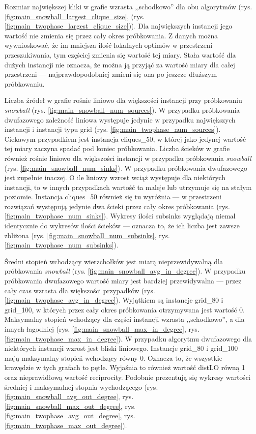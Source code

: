 Rozmiar największej kliki w grafie wzrasta ,,schodkowo'' dla obu algorytmów (rys. \ref{fig:main_snowball_largest_clique_size}, (rys. \ref{fig:main_twophase_largest_clique_size})).
Dla największych instancji jego wartość nie zmienia się przez cały okres próbkowania.
Z danych można wywnioskować, że im mniejsza ilość lokalnych optimów w przestrzeni przeszukiwania, tym częściej zmienia się wartość tej miary.
Stała wartość dla dużych instancji nie oznacza, że można ją przyjąć za wartość miary dla całej przestrzeni --- najprawdopodobniej zmieni się
ona po jeszcze dłuższym próbkowaniu.

Liczba źródeł w grafie rośnie liniowo dla większości instancji przy próbkowaniu \textit{snowball} (rys. \ref{fig:main_snowball_num_sources}).
W przypadku próbkowania dwufazowego zależność liniowa występuje jedynie w przypadku największych instancji i instancji typu grid (rys. \ref{fig:main_twophase_num_sources}).
Ciekawym przypadkiem jest instancja cliques\_50, w której jako jedynej wartość tej miary zaczyna spadać pod koniec próbkowania.
Liczba ścieków w grafie również rośnie liniowo dla większości instancji w przypadku próbkowania \textit{snowball} (rys. \ref{fig:main_snowball_num_sinks}).
W przypadku próbkowania dwufazowego jest zupełnie inaczej. O ile liniowy wzrost wciąż występuje dla niektórych instancji, to w innych przypadkach
wartość ta maleje lub utrzymuje się na stałym poziomie. Instancja cliques\_50 również się tu wyróżnia --- w przestrzeni rozwiązań występują jedynie dwa ścieki
przez cały okres próbkowania (rys. \ref{fig:main_twophase_num_sinks}).
Wykresy ilości subsinks wyglądają niemal identycznie do wykresów ilości ścieków --- oznacza to, że ich liczba jest zawsze zbliżona
(rys. \ref{fig:main_snowball_num_subsinks}, rys. \ref{fig:main_twophase_num_subsinks}).

Średni stopień wchodzący wierzchołków jest miarą nieprzewidywalną dla próbkowania \textit{snowball} (rys. \ref{fig:main_snowball_avg_in_degree}).
W przypadku próbkowania dwufazowego wartość miary jest bardziej przewidywalna --- przez cały czas wzrasta dla większości przypadków (rys. \ref{fig:main_twophase_avg_in_degree}).
Wyjątkiem są instancje grid\_80 i grid\_100, w których przez cały okres próbkowania otrzymywana jest wartość 0.
Maksymalny stopień wchodzący dla części instancji wzrasta ,,schodkowo'', a dla innych łagodniej (rys. \ref{fig:main_snowball_max_in_degree}, rys. \ref{fig:main_twophase_max_in_degree}).
W przypadku algorytmu dwufazowego dla niektórych instancji wzrost jest bliski liniowego.
Instancje grid\_80 i grid\_100 mają maksymalny stopień wchodzący równy 0.
Oznacza to, że wszystkie krawędzie w tych grafach to pętle. Wyjaśnia to również wartość distLO równą 1 oraz nieprawidłową wartość reciprocity.
Podobnie prezentują się wykresy wartości średniej i maksymalnej stopnia wychodzącego
(rys. \ref{fig:main_snowball_avg_out_degree}, rys. \ref{fig:main_snowball_max_out_degree}, rys. \ref{fig:main_twophase_avg_out_degree}, rys. \ref{fig:main_twophase_max_out_degree}).

